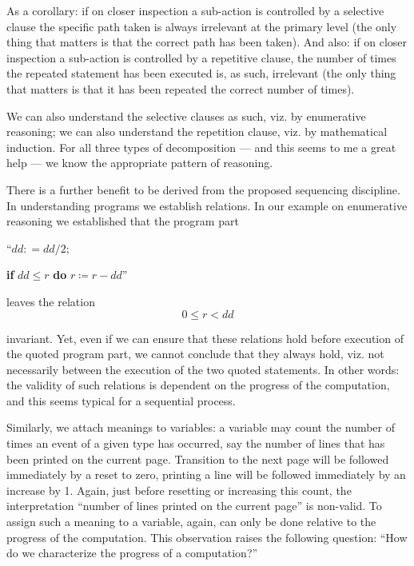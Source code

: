 As a corollary: if on closer inspection a sub-action is controlled by a selective clause the specific path taken is always irrelevant at the primary level (the only thing that matters is that the correct path has been taken). And also: if on closer inspection a sub-action is controlled by a repetitive clause, the number of times the repeated statement has been executed is, as such, irrelevant (the only thing that matters is that it has been repeated the correct number of times).

We can also understand the selective clauses as such, viz. by enumerative reasoning; we can also understand the repetition clause, viz. by mathematical induction. For all three types of decomposition --- and this seems to me a great help --- we know the appropriate pattern of reasoning.

There is a further benefit to be derived from the proposed sequencing discipline. In understanding programs we establish relations. In our example on enumerative reasoning we established that the program part
\medskip

{
	\setlength{\parindent}{8em}
	\hspace{-.5em}``$dd: = dd/2;$
	
	\textbf{if} $dd \leqslant r$ \textbf{do} $r \coloneq r - dd$''
}
\medskip

\noindent
leaves the relation
$$
0 \leqslant r < dd
$$

\noindent
invariant. Yet, even if we can ensure that these relations hold before execution of the quoted program part, we cannot conclude that they always hold, viz. not necessarily between the execution of the two quoted statements. In other words: the validity of such relations is dependent on the progress of the computation, and this seems typical for a sequential process.

Similarly, we attach meanings to variables: a variable may count the number of times an event of a given type has occurred, say the number of lines that has been printed on the current page. Transition to the next page will be followed immediately by a reset to zero, printing a line will be followed immediately by an increase by 1. Again, just before resetting or increasing this count, the interpretation ``number of lines printed on the current page'' is non-valid. To assign such a meaning to a variable, again, can only be done relative to the progress of the computation. This observation raises the following question: ``How do we characterize the progress of a computation?''

